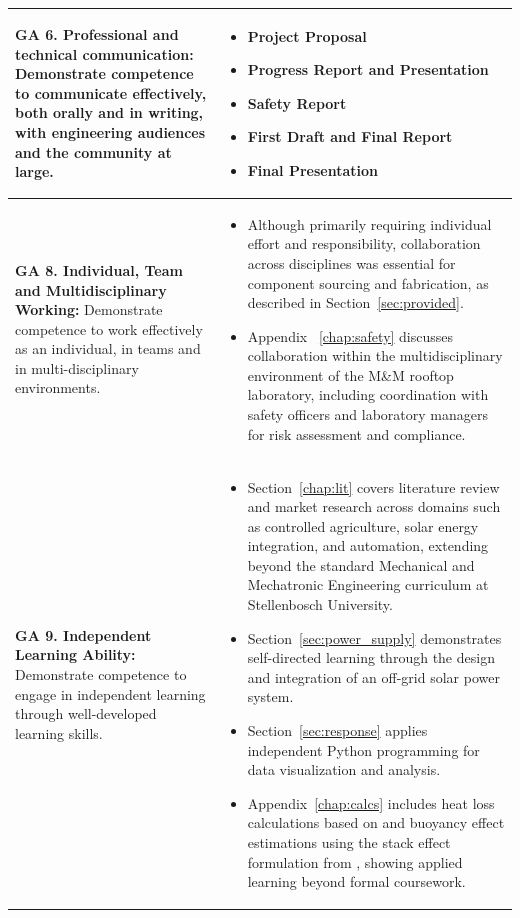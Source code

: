 \begin{longtable}{|p{}|p{}|}
	\textbf{GA 6. Professional and technical communication:} Demonstrate competence to communicate effectively, both orally and in writing, with engineering audiences and the community at large. &
	\begin{itemize}[leftmargin=*, nosep]
		\item Project Proposal
		\item Progress Report and Presentation
		\item Safety Report
		\item First Draft and Final Report
		\item Final Presentation
	\end{itemize}
	\\ \hline
	
	\textbf{GA 8. Individual, Team and Multidisciplinary Working:} Demonstrate competence to work effectively as an individual, in teams and in multi-disciplinary environments. &
	\begin{itemize}[leftmargin=*, nosep]
		\item Although primarily requiring individual effort and responsibility, collaboration across disciplines was essential for component sourcing and fabrication, as described in Section~\ref{sec:provided}.
		\item Appendix ~\ref{chap:safety} discusses collaboration within the multidisciplinary environment of the M\&M rooftop laboratory, including coordination with safety officers and laboratory managers for risk assessment and compliance.
	\end{itemize}
	\\ \hline
	
	\textbf{GA 9. Independent Learning Ability:} Demonstrate competence to engage in independent learning through well-developed learning skills. &
	\begin{itemize}[leftmargin=*, nosep]
		\item Section~\ref{chap:lit} covers literature review and market research across domains such as controlled agriculture, solar energy integration, and automation, extending beyond the standard Mechanical and Mechatronic Engineering curriculum at Stellenbosch University.
		\item Section~\ref{sec:power_supply} demonstrates self-directed learning through the design and integration of an off-grid solar power system.
		\item Section~\ref{sec:response} applies independent Python programming for data visualization and analysis.
		\item Appendix~\ref{chap:calcs} includes heat loss calculations based on \citep{heat} and buoyancy effect estimations using the stack effect formulation from \citep{stack}, showing applied learning beyond formal coursework.
	\end{itemize}
	\\ \hline
	
\end{longtable}


